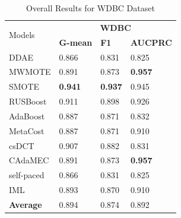 \begin{table}[h]
    \centering
    \begin{tabular}{|p{}<{\centering}|p{}<{\centering}|p{}<{\centering}|p{}<{\centering}|}
    \hline
    \multirow{2}{*}{Models} & \multicolumn{3}{c|}{\textbf{WDBC}}    \\ \cline{2-4} 
                             & \textbf{G-mean} & \textbf{F1} & \textbf{AUCPRC} \\ \hline
    DDAE                     & 0.866	&0.831	&0.825               \\ \hline
    MWMOTE                   &0.891	&0.873	&\textbf{0.957}              \\ \hline
    SMOTE                    & \textbf{0.941}	&\textbf{0.937}	&0.945               \\ \hline
    RUSBoost                 &0.911	&0.898	&0.926              \\ \hline
    AdaBoost                 & 0.887	&0.871	&0.832               \\ \hline
    MetaCost                 & 0.887	&0.871	&0.910              \\ \hline
    csDCT                    & 0.907	&0.882	&0.831               \\ \hline
    CAdaMEC                  & 0.891	&0.873	&\textbf{0.957}               \\ \hline
    self-paced               & 0.866	&0.831	&0.825                \\ \hline
    IML                      & 0.893	&0.870	&0.910             \\ \hline\hline
    \textbf{Average}         & 0.894	&0.874	&0.892               \\ \hline
    \end{tabular}
    \vspace{-8pt}
    \caption{Overall Results for WDBC Dataset}
    \label{tab14}
\end{table}
\vspace{-13pt}
